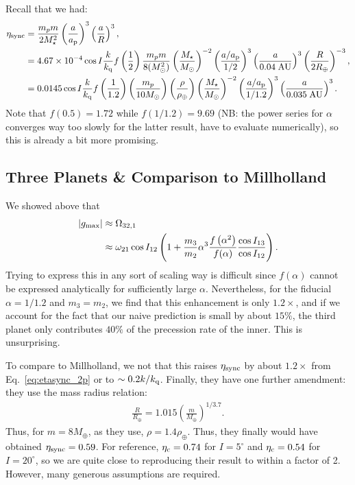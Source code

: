 \documentclass[11pt,
        usenames, %
        dvipsnames %
    ]{article}
\newcommand*{\abs}[1]{\left|#1\right|}
\newcommand*{\p}[1]{\left(#1\right)}
\begin{document}
Recall that we had:
\begin{align}
    \eta_{\rm sync} &= \frac{m_pm}{2M_\star^2}\p{\frac{a}{a_{\rm p}}}^3
            \p{\frac{a}{R}}^3,\\
        &= 4.67 \times 10^{-4}
            \cos I \frac{k}{k_{\rm q}}f\p{\frac{1}{2}}
            \frac{m_pm}{8(M_{\odot}^2)}
            \p{\frac{M_\star}{M_{\odot}}}^{-2}
            \p{\frac{a/a_{\rm p}}{1/2}}^3
            \p{\frac{a}{0.04\;\mathrm{AU}}}^3
            \p{\frac{R}{2R_{\oplus}}}^{-3},\\
        &= 0.0145
            \cos I \frac{k}{k_{\rm q}}f\p{\frac{1}{1.2}}
            \p{\frac{m_p}{10M_{\odot}}}
            \p{\frac{\rho}{\rho_{\oplus}}}
            \p{\frac{M_\star}{M_{\odot}}}^{-2}
            \p{\frac{a/a_{\rm p}}{1/1.2}}^3
            \p{\frac{a}{0.035\;\mathrm{AU}}}^3.\label{eq:etasync_2p}
\end{align}
Note that $f(0.5) = 1.72$ while $f(1/1.2) = 9.69$ (NB\@: the power series for
$\alpha$ converges way too slowly for the latter result, have to evaluate
numerically), so this is already a bit more promising.

\subsection{Three Planets \& Comparison to Millholland}

We showed above that
\begin{align}
    \abs{g_{\max}} &\approx \Omega_{\rm 32, 1}\nonumber\\
        &\approx \omega_{21}\cos I_{12}
            \p{1 + \frac{m_3}{m_2}\alpha^3\frac{f\p{\alpha^2}}{f(\alpha)}
                \frac{\cos I_{13}}{\cos I_{12}}}.
\end{align}
Trying to express this in any sort of scaling way is difficult since $f(\alpha)$
cannot be expressed analytically for sufficiently large $\alpha$. Nevertheless,
for the fiducial $\alpha = 1/1.2$ and $m_3 = m_2$, we find that this enhancement
is only $1.2\times$, and if we account for the fact that our naive prediction
is small by about $15\%$, the third planet only contributes $40\%$ of the
precession rate of the inner. This is unsurprising.

To compare to Millholland, we not that this raises $\eta_{\rm sync}$ by about
$1.2\times$ from Eq.~\eqref{eq:etasync_2p} or to $\sim 0.2 k/k_{\rm q}$.
Finally, they have one further amendment: they use the mass radius relation:
\begin{align}
    \frac{R}{R_{\oplus}} = 1.015\p{\frac{m}{M_{\oplus}}}^{1/3.7}.
\end{align}
Thus, for $m = 8M_{\oplus}$, as they use, $\rho = 1.4\rho_{\oplus}$. Thus, they
finally would have obtained $\eta_{\rm sync} = 0.59$. For reference, $\eta_{\rm
c} = 0.74$ for $I = 5^\circ$ and $\eta_{\rm c} = 0.54$ for $I = 20^\circ$, so we
are quite close to reproducing their result to within a factor of 2. However,
many generous assumptions are required.
\end{document}
